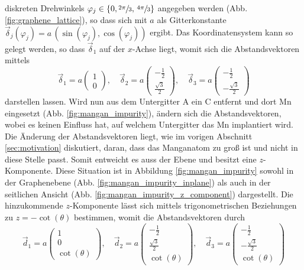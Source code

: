 diskreten Drehwinkels ${\varphi_j \in \{ 0,  \sfrac{2\pi}{3}, \, \sfrac{4\pi}{3} \} }$ angegeben werden (Abb. \ref{fig:graphene_lattice}), so dass sich mit $a$ als Gitterkonstante
$\vec{\delta}_j(\varphi_j) = a \, ( \sin (\varphi_j), \cos (\varphi_j) )$
ergibt.
Das Koordinatensystem kann so gelegt werden, so dass $\vec{\delta}_1$ auf der $x$-Achse liegt, womit sich die Abstandsvektoren mittels
\begin{equation}
    \vec{\delta}_1 = a \begin{pmatrix} 1            \\[4pt] 0                   \end{pmatrix}, \quad
    \vec{\delta}_2 = a \begin{pmatrix} -\frac{1}{2} \\[4pt] \frac{\sqrt{3}}{2}  \end{pmatrix}, \quad 
    \vec{\delta}_3 = a \begin{pmatrix} -\frac{1}{2} \\[4pt] -\frac{\sqrt{3}}{2} \end{pmatrix} \label{eqn:nnvec}
\end{equation}
darstellen lassen.
Wird nun aus dem Untergitter A ein C entfernt und dort Mn eingesetzt (Abb. \ref{fig:mangan_impurity}), 
ändern sich die Abstandsvektoren, wobei es keinen Einfluss hat, auf welchem Untergitter das Mn implantiert wird.
Die Änderung der Abstandsvektoren liegt, wie im vorigen Abschnitt \ref{sec:motivation} diskutiert, daran, dass das Manganatom zu groß ist 
und nicht in diese Stelle passt.
Somit entweicht es auss der Ebene und  besitzt eine $z$-Komponente.
Diese Situation ist in Abbildung \ref{fig:mangan_impurity} sowohl in der Graphenebene (Abb. \ref{fig:mangan_impurity_inplane}) als auch in der 
seitlichen Ansicht (Abb. \ref{fig:mangan_impurity_z_component}) dargestellt.
Die hinzukommende $z$-Komponente lässt sich mittels trigonometrischen Beziehungen zu $z = -\cot (\theta)$ bestimmen, womit die 
Abstandsvektoren durch 
\begin{equation}
    \vec{d}_1 = a \begin{pmatrix} 1            \\[4pt] 0                   \\[4pt] \cot (\theta)\end{pmatrix}, \quad
    \vec{d}_2 = a \begin{pmatrix} -\frac{1}{2} \\[4pt] \frac{\sqrt{3}}{2}  \\[4pt] \cot (\theta)\end{pmatrix}, \quad 
    \vec{d}_3 = a \begin{pmatrix} -\frac{1}{2} \\[4pt] -\frac{\sqrt{3}}{2} \\[4pt] \cot (\theta)\end{pmatrix}   \label{eqn:disvec}
\end{equation}
